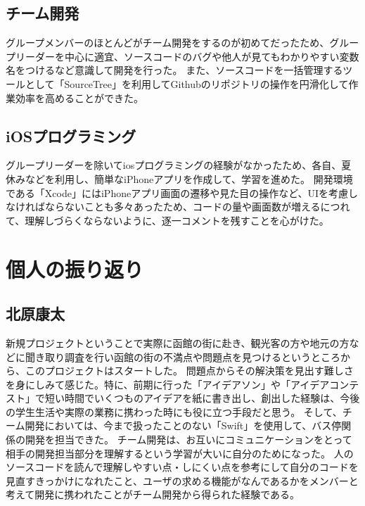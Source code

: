 \documentclass[openany,11pt,papersize]{jsbook}
\begin{document}
\subsection{チーム開発}
グループメンバーのほとんどがチーム開発をするのが初めてだったため、グループリーダーを中心に適宜、ソースコードのバグや他人が見てもわかりやすい変数名をつけるなど意識して開発を行った。
また、ソースコードを一括管理するツールとして「SourceTree」を利用してGithubのリポジトリの操作を円滑化して作業効率を高めることができた。


\subsection{iOSプログラミング}
グループリーダーを除いてiosプログラミングの経験がなかったため、各自、夏休みなどを利用し、簡単なiPhoneアプリを作成して、学習を進めた。
開発環境である「Xcode」にはiPhoneアプリ画面の遷移や見た目の操作など、UIを考慮しなければならないことも多々あったため、コードの量や画面数が増えるにつれて、理解しづらくならないように、逐一コメントを残すことを心がけた。


\section{個人の振り返り}
\subsection{北原康太}
新規プロジェクトということで実際に函館の街に赴き、観光客の方や地元の方などに聞き取り調査を行い函館の街の不満点や問題点を見つけるというところから、このプロジェクトはスタートした。
問題点からその解決策を見出す難しさを身にしみて感じた。特に、前期に行った「アイデアソン」や「アイデアコンテスト」で短い時間でいくつものアイデアを紙に書き出し、創出した経験は、今後の学生生活や実際の業務に携わった時にも役に立つ手段だと思う。
そして、チーム開発においては、今まで扱ったことのない「Swift」を使用して、バス停関係の開発を担当できた。
チーム開発は、お互いにコミュニケーションをとって相手の開発担当部分を理解するという学習が大いに自分のためになった。
人のソースコードを読んで理解しやすい点・しにくい点を参考にして自分のコードを見直すきっかけになれたこと、ユーザの求める機能がなんであるかをメンバーと考えて開発に携われたことがチーム開発から得られた経験である。

\end{document}
